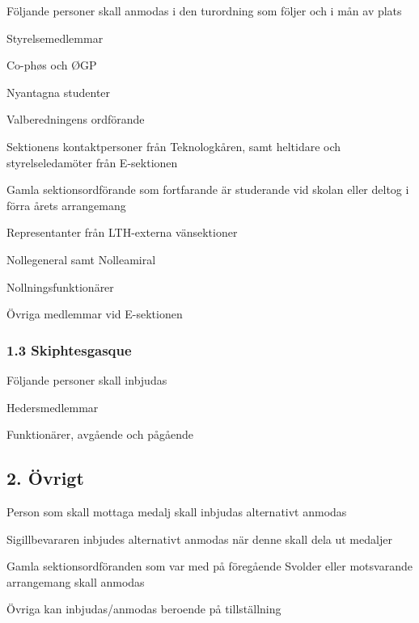 \documentclass[10pt]{article}
\begin{document}
Följande personer skall anmodas i den turordning som följer och i mån av plats
\begin{dashlist}
    \item Styrelsemedlemmar 
    \item Co-phøs och ØGP
    \item Nyantagna studenter
    \item Valberedningens ordförande
    \item Sektionens kontaktpersoner från Teknologkåren, samt heltidare och styrelseledamöter från E-sektionen
    \item Gamla sektionsordförande som fortfarande är studerande vid skolan eller deltog i förra årets arrangemang
    \item Representanter från LTH-externa vänsektioner
    \item Nollegeneral samt Nolleamiral
    \item Nollningsfunktionärer
    \item Övriga medlemmar vid E-sektionen
\end{dashlist}

\subsubsection*{1.3 Skiphtesgasque}
Följande personer skall inbjudas
\begin{dashlist}
    \item Hedersmedlemmar
    \item Funktionärer, avgående och pågående
\end{dashlist}

\subsection*{2. Övrigt}

\begin{dashlist}
    \item Person som skall mottaga medalj skall inbjudas alternativt anmodas
    \item Sigillbevararen inbjudes alternativt anmodas när denne skall dela ut medaljer
    \item Gamla sektionsordföranden som var med på föregående Svolder eller motsvarande arrangemang skall anmodas
    \item Övriga kan inbjudas/anmodas beroende på tillställning
\end{dashlist}
\end{document}
